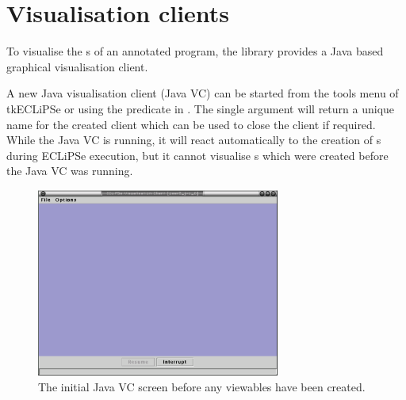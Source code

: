%
% 
% 
% 
% 

\chapter{Visualisation clients}
\label{sec:visu-clients}

To visualise the \viewable{}s of an annotated program, the library
 provides a Java
based graphical visualisation client.

A new Java visualisation client (Java VC) can be started from the
tools menu of tkECLiPSe or using the predicate \startvcone{} in
. The single
argument will return a unique name for the created client which can be
used to close the client if required.  While the Java VC is running,
it will react automatically to the creation of \viewable{}s during
ECLiPSe execution, but it cannot visualise \viewable{}s which were
created before the Java VC was running.

\begin{figure}[htsp]
\centering
\includegraphics[width=8cm]{vcstartup}
\caption{The initial Java VC screen before any viewables have been created.}
\label{fig:startup}
\end{figure}


